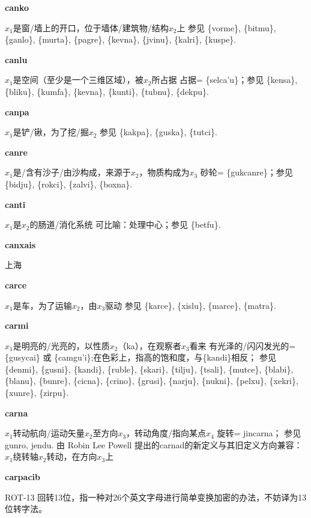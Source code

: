 \documentclass[notitlepage,twocolumn,a4paper,10pt]{book}
\begin{document}
{\sffamily\bfseries canko}\enspace {\ttfamily\bfseries[        ca'o]}  $x_1$是窗\slash{}墙上的开口，位于墙体\slash{}建筑物\slash{}结构$x_2$上 \textemdash{} 参见 \{vorme\}, \{bitmu\}, \{ganlo\}, \{murta\}, \{pagre\}, \{kevna\}, \{jvinu\}, \{kalri\}, \{kuspe\}.

{\sffamily\bfseries canlu}\enspace {\ttfamily\bfseries[cal     ca'u]}  $x_1$是空间（至少是一个三维区域），被$x_2$所占据 \textemdash{} 占据= \{selca'u\}；参见 \{kensa\}, \{bliku\}, \{kumfa\}, \{kevna\}, \{kunti\}, \{tubnu\}, \{dekpu\}.

{\sffamily\bfseries canpa}\enspace {\ttfamily\bfseries[    cna]}  $x_1$是铲\slash{}锹，为了挖\slash{}掘$x_2$ \textemdash{} 参见 \{kakpa\}, \{guska\}, \{tutci\}.

{\sffamily\bfseries canre}\enspace {\ttfamily\bfseries[can]}  $x_1$是\slash{}含有沙子\slash{}由沙构成，来源于$x_2$，物质构成为$x_3$ \textemdash{} 砂轮= \{gukcanre\}；参见 \{bidju\}, \{rokci\}, \{zalvi\}, \{boxna\}.

{\sffamily\bfseries canti} $x_1$是$x_2$的肠道\slash{}消化系统 \textemdash{} 可比喻：处理中心；参见 \{betfu\}.

{\sffamily\bfseries canxais} 上海

{\sffamily\bfseries carce} $x_1$是车，为了运输$x_2$，由$x_3$驱动 \textemdash{} 参见 \{karce\}, \{xislu\}, \{marce\}, \{matra\}.

{\sffamily\bfseries carmi}  $x_1$是明亮的\slash{}光亮的，以性质$x_2$（ka），在观察者$x_3$看来 \textemdash{} 有光泽的\slash{}闪闪发光的=\{gusycai\} 或 \{camgu'i\};在色彩上，指高的饱和度，与\{kandi\}相反； 参见 \{denmi\}, \{gusni\}, \{kandi\}, \{ruble\}, \{skari\}, \{tilju\}, \{tsali\}, \{mutce\}, \{blabi\}, \{blanu\}, \{bunre\}, \{cicna\}, \{crino\}, \{grusi\}, \{narju\}, \{nukni\}, \{pelxu\}, \{xekri\}, \{xunre\}, \{zirpu\}.

{\sffamily\bfseries carna}\enspace {\ttfamily\bfseries[car]}  $x_1$转动航向\slash{}运动矢量$x_2$至方向$x_3$，转动角度\slash{}指向某点$x_4$ \textemdash{} 旋转= {jincarna}； 参见 {gunro}, {jendu}. 由 Robin Lee Powell 提出的{carna}d的新定义与其旧定义方向兼容：$x_1$绕转轴$x_2$转动，在方向$x_3$上

{\sffamily\bfseries carpacib} ROT-13 \textemdash{} 回转13位，指一种对26个英文字母进行简单变换加密的办法，不妨译为13位转字法。
\end{document}
